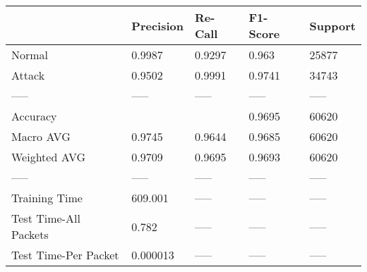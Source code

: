 \begin{tabular}{lllll}
\toprule
{} & Precision & Re-Call & F1-Score & Support \\
\midrule
Normal                &    0.9987 &  0.9297 &    0.963 &   25877 \\
Attack                &    0.9502 &  0.9991 &   0.9741 &   34743 \\
-----                 &     ----- &   ----- &    ----- &   ----- \\
Accuracy              &           &         &   0.9695 &   60620 \\
Macro AVG             &    0.9745 &  0.9644 &   0.9685 &   60620 \\
Weighted AVG          &    0.9709 &  0.9695 &   0.9693 &   60620 \\
-----                 &     ----- &   ----- &    ----- &   ----- \\
Training Time         &   609.001 &   ----- &    ----- &   ----- \\
Test Time-All Packets &     0.782 &   ----- &    ----- &   ----- \\
Test Time-Per Packet  &  0.000013 &   ----- &    ----- &   ----- \\
\bottomrule
\end{tabular}
